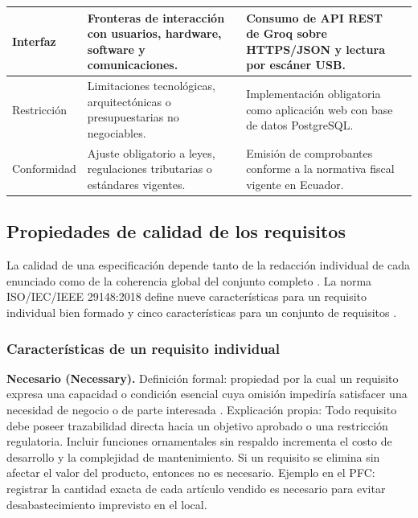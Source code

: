 \documentclass[onecolumn,12pt,a4paper]{IEEEtran}
\begin{document}
\begin{longtable}{>{\raggedright\arraybackslash}p{2.6cm} >{\raggedright\arraybackslash}p{5.2cm} >{\raggedright\arraybackslash}p{5.2cm} >{\raggedright\arraybackslash}p{2.0cm}}
		\midrule
		Interfaz & Fronteras de interacci\'on con usuarios, hardware, software y comunicaciones. & Consumo de API REST de Groq sobre HTTPS/JSON y lectura por esc\'aner USB. & \cite{iso29148,hull2011} \\
		\midrule
		Restricci\'on & Limitaciones tecnol\'ogicas, arquitect\'onicas o presupuestarias no negociables. & Implementaci\'on obligatoria como aplicaci\'on web con base de datos PostgreSQL. & \cite{pohl2025,glinz2007,ireb2023} \\
		\midrule
		Conformidad & Ajuste obligatorio a leyes, regulaciones tributarias o est\'andares vigentes. & Emisi\'on de comprobantes conforme a la normativa fiscal vigente en Ecuador. & \cite{iso29148,swebok4} \\
	\end{longtable}

	\subsection{Propiedades de calidad de los requisitos}

	La calidad de una especificaci\'on depende tanto de la redacci\'on individual de cada enunciado como de la coherencia global del conjunto completo \cite{iso29148,pohl2025,ireb2023}. La norma ISO/IEC/IEEE 29148:2018 define nueve caracter\'isticas para un requisito individual bien formado y cinco caracter\'isticas para un conjunto de requisitos \cite{iso29148}.

	\subsubsection*{Caracter\'isticas de un requisito individual}

	\textbf{Necesario (Necessary).} Definici\'on formal: propiedad por la cual un requisito expresa una capacidad o condici\'on esencial cuya omisi\'on impedir\'ia satisfacer una necesidad de negocio o de parte interesada \cite{iso29148,ireb2023}. Explicaci\'on propia: Todo requisito debe poseer trazabilidad directa hacia un objetivo aprobado o una restricci\'on regulatoria. Incluir funciones ornamentales sin respaldo incrementa el costo de desarrollo y la complejidad de mantenimiento. Si un requisito se elimina sin afectar el valor del producto, entonces no es necesario. Ejemplo en el PFC: registrar la cantidad exacta de cada art\'iculo vendido es necesario para evitar desabastecimiento imprevisto en el local.
\end{document}
